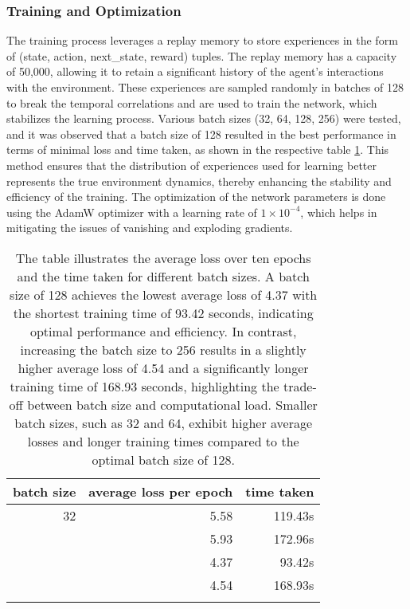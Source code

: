\subsubsection{Training and Optimization}
The training process leverages a replay memory to store experiences in the form of (state, action, next\_state, reward) tuples. The replay memory has a capacity of 50,000, allowing it to retain a significant history of the agent's interactions with the environment. These experiences are sampled randomly in batches of 128 to break the temporal correlations and are used to train the network, which stabilizes the learning process. Various batch sizes (32, 64, 128, 256) were tested, and it was observed that a batch size of 128 resulted in the best performance in terms of minimal loss and time taken, as shown in the respective table \ref{tab: batch sizes}. This method ensures that the distribution of experiences used for learning better represents the true environment dynamics, thereby enhancing the stability and efficiency of the training. The optimization of the network parameters is done using the AdamW optimizer with a learning rate of $1 \times 10^{-4}$, which helps in mitigating the issues of vanishing and exploding gradients.

\begin{table}[!h]
    \centering
    \begin{tabular}{rrr}
        \toprule
         \textbf{batch size} & \textbf{average loss per epoch} & \textbf{time taken} 
         \\ \midrule
          32 & 5.58  & 119.43s \\ \addlinespace
         64 & 5.93 & 172.96s \\ \addlinespace
        128 & 4.37 & 93.42s \\ \addlinespace
         256 & 4.54 & 168.93s \\ \addlinespace
         \bottomrule
    \end{tabular}
    \caption{The table illustrates the average loss over ten epochs and the time taken for different batch sizes. A batch size of 128 achieves the lowest average loss of 4.37 with the shortest training time of 93.42 seconds, indicating optimal performance and efficiency. In contrast, increasing the batch size to 256 results in a slightly higher average loss of 4.54 and a significantly longer training time of 168.93 seconds, highlighting the trade-off between batch size and computational load. Smaller batch sizes, such as 32 and 64, exhibit higher average losses and longer training times compared to the optimal batch size of 128.}
    \label{tab: batch sizes}
\end{table}

